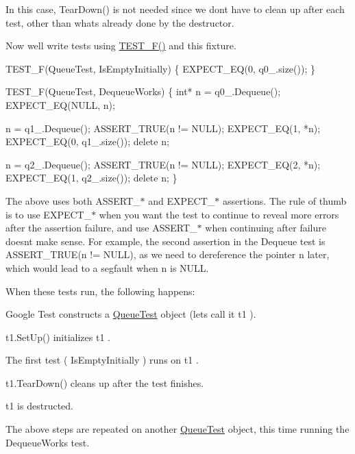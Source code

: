 In this case, {\ttfamily Tear\+Down()} is not needed since we don\textquotesingle{}t have to clean up after each test, other than what\textquotesingle{}s already done by the destructor.

Now we\textquotesingle{}ll write tests using {\ttfamily \hyperlink{gtest_8h_a0ee66d464d1a06c20c1929cae09d8758}{T\+E\+S\+T\+\_\+\+F()}} and this fixture. 
\begin{DoxyCode}
TEST\_F(QueueTest, IsEmptyInitially) \{
  EXPECT\_EQ(0, q0\_.size());
\}

TEST\_F(QueueTest, DequeueWorks) \{
  int* n = q0\_.Dequeue();
  EXPECT\_EQ(NULL, n);

  n = q1\_.Dequeue();
  ASSERT\_TRUE(n != NULL);
  EXPECT\_EQ(1, *n);
  EXPECT\_EQ(0, q1\_.size());
  delete n;

  n = q2\_.Dequeue();
  ASSERT\_TRUE(n != NULL);
  EXPECT\_EQ(2, *n);
  EXPECT\_EQ(1, q2\_.size());
  delete n;
\}
\end{DoxyCode}


The above uses both {\ttfamily A\+S\+S\+E\+R\+T\+\_\+$\ast$} and {\ttfamily E\+X\+P\+E\+C\+T\+\_\+$\ast$} assertions. The rule of thumb is to use {\ttfamily E\+X\+P\+E\+C\+T\+\_\+$\ast$} when you want the test to continue to reveal more errors after the assertion failure, and use {\ttfamily A\+S\+S\+E\+R\+T\+\_\+$\ast$} when continuing after failure doesn\textquotesingle{}t make sense. For example, the second assertion in the {\ttfamily Dequeue} test is {\ttfamily A\+S\+S\+E\+R\+T\+\_\+\+T\+R\+UE(n != N\+U\+LL)}, as we need to dereference the pointer {\ttfamily n} later, which would lead to a segfault when {\ttfamily n} is {\ttfamily N\+U\+LL}.

When these tests run, the following happens\+:
\begin{DoxyEnumerate}
\item Google Test constructs a {\ttfamily \hyperlink{classQueueTest}{Queue\+Test}} object (let\textquotesingle{}s call it {\ttfamily t1} ).
\end{DoxyEnumerate}
\begin{DoxyEnumerate}
\item {\ttfamily t1.\+Set\+Up()} initializes {\ttfamily t1} .
\end{DoxyEnumerate}
\begin{DoxyEnumerate}
\item The first test ( {\ttfamily Is\+Empty\+Initially} ) runs on {\ttfamily t1} .
\end{DoxyEnumerate}
\begin{DoxyEnumerate}
\item {\ttfamily t1.\+Tear\+Down()} cleans up after the test finishes.
\end{DoxyEnumerate}
\begin{DoxyEnumerate}
\item {\ttfamily t1} is destructed.
\end{DoxyEnumerate}
\begin{DoxyEnumerate}
\item The above steps are repeated on another {\ttfamily \hyperlink{classQueueTest}{Queue\+Test}} object, this time running the {\ttfamily Dequeue\+Works} test.
\end{DoxyEnumerate}

